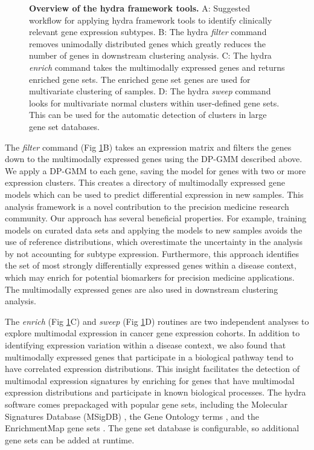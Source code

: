 \documentclass[10pt,letterpaper]{article}
\providecommand{\DIFaddtex}[1]{{\protect\color{blue}\uwave{#1}}} %
\providecommand{\DIFaddFL}[1]{\DIFadd{#1}} %
\providecommand{\DIFaddbeginFL}{} %
\providecommand{\DIFaddendFL}{} %
\providecommand{\DIFadd}[1]{\texorpdfstring{\DIFaddtex{#1}}{#1}} %
\newcommand{\DIFaddincludegraphics}[2][]{{\color{blue}\fbox{\DIFOincludegraphics[#1]{#2}}}} %
\DeclareRobustCommand{\DIFaddbeginFL}{\DIFOaddbeginFL \let\includegraphics\DIFaddincludegraphics} %
\DeclareRobustCommand{\DIFaddendFL}{\DIFOaddendFL \let\includegraphics\DIFOincludegraphics} %
\begin{document}
\begin{figure}[h!]
	\caption{{\bf Overview of the hydra framework tools.}
		A: Suggested workflow for applying hydra framework tools to identify clinically relevant gene expression subtypes. B: The hydra \textit{filter} command removes unimodally distributed genes which greatly reduces the number of genes in downstream clustering analysis. C: The hydra \textit{enrich} command takes the multimodally expressed genes and returns enriched gene sets. The enriched gene set genes are used for multivariate clustering of samples. D: The hydra
		\textit{sweep} command looks for multivariate normal clusters within user-defined gene sets. This can be used for the automatic detection of clusters in large gene set databases. \DIFaddbeginFL \DIFaddFL{Abbreviations: Tumor microenvironment (TME) 
		}\DIFaddendFL \label{overview}}
\end{figure}

The \textit{filter} command (Fig \ref{overview}B) takes an expression matrix and filters the genes down to the multimodally expressed genes using the DP-GMM described above. We apply a DP-GMM to each gene, saving the model for genes with two or more expression clusters. This creates a directory of multimodally expressed gene models which can be used to predict differential expression in new samples. This analysis framework is a novel contribution to the precision medicine research community. Our approach has several beneficial properties. For example, training models on curated data sets and applying the models to new samples avoids the use of reference distributions, which overestimate the uncertainty in the analysis by not accounting for subtype expression. Furthermore, this approach identifies the set of most strongly differentially expressed genes within a disease context, which may enrich for potential biomarkers for precision medicine applications. The multimodally expressed genes are also used in downstream clustering analysis.

The \textit{enrich} (Fig \ref{overview}C) and \textit{sweep} (Fig \ref{overview}D) routines are two independent analyses to explore multimodal expression in cancer gene expression cohorts. In addition to identifying expression variation within a disease context, we also found that multimodally expressed genes that participate in a biological pathway tend to have correlated expression distributions. This insight facilitates the detection of multimodal expression signatures by enriching for genes that have multimodal expression distributions and participate in known biological processes. The hydra software comes prepackaged with popular gene sets, including the Molecular Signatures Database (MSigDB) \cite{liberzonMolecularSignaturesDatabase2011}, the Gene Ontology terms \cite{Ashburner2000, gene2018gene}, and the EnrichmentMap gene sets \cite{merico2010enrichment}. The gene set database is configurable, so additional gene sets can be added at runtime.
\end{document}
